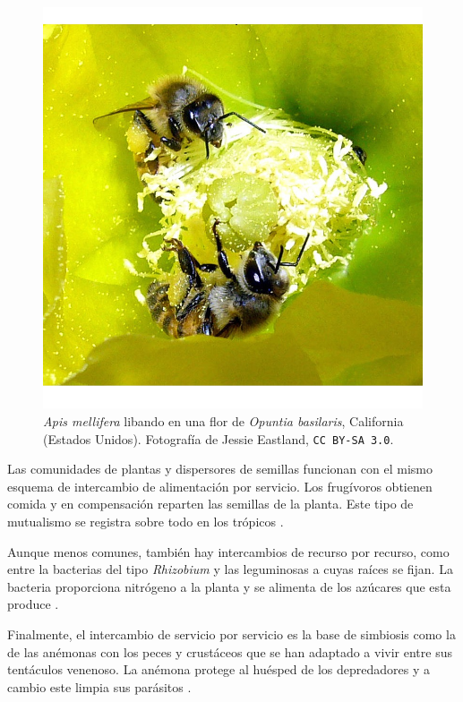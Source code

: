 \begin{figure}[h!]
\centering
\includegraphics[scale=0.33]{Figures/INTRO_Pollination.jpg}
\caption{\textit{Apis mellifera} libando en una flor de \textit{Opuntia basilaris}, California (Estados Unidos). Fotografía de Jessie Eastland, \small{\texttt{CC BY-SA 3.0}}.}
\label{fig:INTRO_Pollination}
\end{figure}

Las comunidades de plantas y dispersores de semillas funcionan con el mismo esquema de intercambio de alimentación por servicio. Los frugívoros obtienen comida y en compensación reparten las semillas de la planta. Este tipo de mutualismo se registra sobre todo en los trópicos \cite{bascompte2007plant, estrada2012frugivores}.
	
Aunque menos comunes, también hay intercambios de recurso por recurso, como entre la bacterias del tipo \textit{Rhizobium} y las leguminosas a cuyas raíces se fijan. La bacteria proporciona nitrógeno a la planta y se alimenta de los azúcares que esta produce \cite{lindstrom2010biodiversity}.
	
Finalmente, el intercambio de servicio por servicio es la base de simbiosis como la de las anémonas con los peces y crustáceos que se han adaptado a vivir entre sus tentáculos venenoso. La anémona protege al huésped de los depredadores y a cambio este limpia sus parásitos \cite{mebs2009chemical}.

